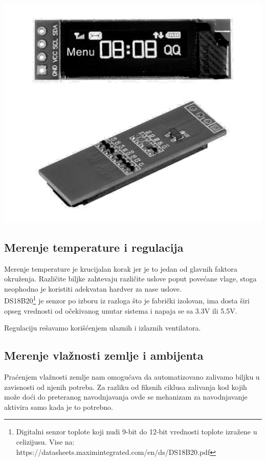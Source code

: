 \documentclass[a4paper,11pt]{book}
\begin{document}
\includegraphics[width=\textwidth]{oled.png}

\subsection{Merenje temperature i regulacija}
Merenje temperature je krucijalan korak jer je to jedan od glavnih faktora okruženja. Različite biljke zahtevaju različite uslove poput povećane vlage, stoga neophodno je koristiti adekvatan hardver za nase uslove.\\ 

\noindent DS18B20\footnote{Digitalni senzor toplote koji nudi 9-bit do 12-bit vrednosti toplote izražene u celizijusu. Vise na: https://datasheets.maximintegrated.com/en/ds/DS18B20.pdf} je senzor po izboru iz razloga što je fabrički izolovan, ima dosta širi opseg vrednosti od očekivanog unutar sistema i napaja se sa 3.3V ili 5.5V.

Regulaciju rešavamo korišćenjem ulaznih i izlaznih ventilatora.

\subsection{Merenje vlažnosti zemlje i ambijenta}
Praćenjem vlažnosti zemlje nam omogućava da automatizovano zalivamo biljku u zavisnosti od njenih potreba. Za razliku od fiksnih ciklusa zalivanja kod kojih može doći do preteranog navodnjavanja ovde se mehanizam za navodnjavanje aktivira samo kada je to potrebno.
\end{document}
